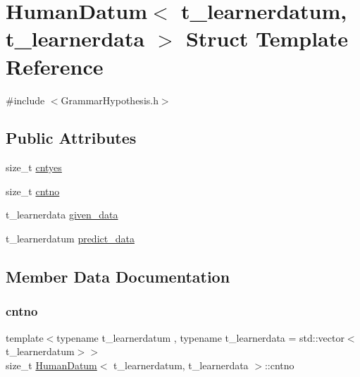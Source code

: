 \hypertarget{struct_human_datum}{}\section{Human\+Datum$<$ t\+\_\+learnerdatum, t\+\_\+learnerdata $>$ Struct Template Reference}
\label{struct_human_datum}


{\ttfamily \#include $<$Grammar\+Hypothesis.\+h$>$}

\subsection*{Public Attributes}
\begin{DoxyCompactItemize}
\item 
size\+\_\+t \hyperlink{struct_human_datum_a3569e7634ea9badbe48105cb3a4e5800}{cntyes}
\item 
size\+\_\+t \hyperlink{struct_human_datum_a713ec5993bc2a348a73f292865a6ddcf}{cntno}
\item 
t\+\_\+learnerdata \hyperlink{struct_human_datum_aab13b229dfedb8c2466f47a58e710431}{given\+\_\+data}
\item 
t\+\_\+learnerdatum \hyperlink{struct_human_datum_ab4676fce2bedc28aca179a17fce99be2}{predict\+\_\+data}
\end{DoxyCompactItemize}


\subsection{Member Data Documentation}
\mbox{\label{struct_human_datum_a713ec5993bc2a348a73f292865a6ddcf}} 
\subsubsection{\texorpdfstring{cntno}{cntno}}
{\footnotesize\ttfamily template$<$typename t\+\_\+learnerdatum , typename t\+\_\+learnerdata  = std\+::vector$<$t\+\_\+learnerdatum$>$$>$ \\
size\+\_\+t \hyperlink{struct_human_datum}{Human\+Datum}$<$ t\+\_\+learnerdatum, t\+\_\+learnerdata $>$\+::cntno}

\mbox{\label{struct_human_datum_a3569e7634ea9badbe48105cb3a4e5800}} 
